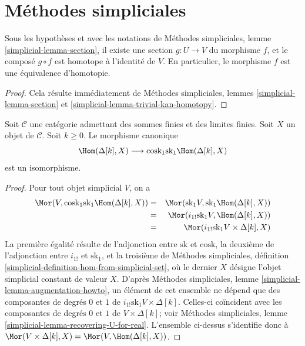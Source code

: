 \section{Méthodes simpliciales}
\label{section-simplicial}


\begin{lemma}
\label{lemma-equiv}
Sous les hypothèses et avec les notations de
Méthodes simpliciales, lemme \ref{simplicial-lemma-section},
il existe une section $g : U \to V$ du morphisme $f$, et
le composé $g \circ f$ est homotope à l'identité de $V$.
En particulier, le morphisme $f$ est une équivalence d'homotopie.
\end{lemma}

\begin{proof}
Cela résulte immédiatement de Méthodes simpliciales, lemmes
\ref{simplicial-lemma-section} et
\ref{simplicial-lemma-trivial-kan-homotopy}.
\end{proof}

\begin{lemma}
\label{lemma-cosk-hom-deltak}
Soit $\mathcal{C}$ une catégorie admettant des sommes finies
et des limites finies. Soit $X$ un objet de $\mathcal{C}$.
Soit $k \geq 0$. Le morphisme canonique
$$
\Hom(\Delta[k], X)
\longrightarrow
\text{cosk}_1 \text{sk}_1 \Hom(\Delta[k], X)
$$
est un isomorphisme.
\end{lemma}

\begin{proof}
Pour tout objet simplicial $V$, on a
\begin{eqnarray*}
\Mor(V, \text{cosk}_1 \text{sk}_1 \Hom(\Delta[k], X))
& = &
\Mor(\text{sk}_1 V, \text{sk}_1 \Hom(\Delta[k], X)) \\
& = &
\Mor(i_{1!} \text{sk}_1 V, \Hom(\Delta[k], X)) \\
& = &
\Mor(i_{1!} \text{sk}_1 V \times \Delta[k], X)
\end{eqnarray*}
La première égalité résulte de l'adjonction entre $\text{sk}$ et $\text{cosk}$,
la deuxième de l'adjonction entre $i_{1!}$ et $\text{sk}_1$, et
la troisième de
Méthodes simpliciales, définition \ref{simplicial-definition-hom-from-simplicial-set},
où le dernier $X$ désigne l'objet simplicial constant de valeur $X$.
D'après Méthodes simpliciales, lemme \ref{simplicial-lemma-augmentation-howto},
un élément de cet ensemble ne dépend que des composantes de degrés $0$ et $1$
de $i_{1!} \text{sk}_1 V \times \Delta[k]$. Celles-ci
coïncident avec les composantes de degrés $0$ et $1$ de
$V \times \Delta[k]$; voir
Méthodes simpliciales, lemme \ref{simplicial-lemma-recovering-U-for-real}.
L'ensemble ci-dessus s'identifie donc à
$\Mor(V \times \Delta[k], X) = \Mor(V, \Hom(\Delta[k], X))$.
\end{proof}

